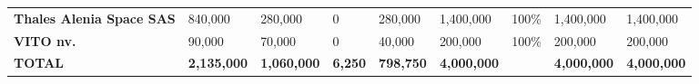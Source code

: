 \begin{landscape}
\begin{table}[H]
{\begin{tabular}{p{5cm}p{5cm}p{5cm}p{5cm}p{5cm}p{5cm}p{5cm}p{5cm}p{5cm}}
    \textbf{Thales Alenia Space SAS}             & 840,000                                                                                               & 280,000                                                                                         &0                                                                                                                & 280,000                                                                                    & 1,400,000                                                                                                  & 100\%                                                                                                & 1,400,000                                                                                           & 1,400,000                                                                                             \\
    \textbf{VITO nv.}                                                                        & 90,000                                                                                                & 70,000                                                                                          &0                                                                                                                & 40,000                                                                                     & 200,000                                                                                                    & 100\%                                                                                                & 200,000                                                                                             & 200,000                                                                                               \\\hline
    \textbf{TOTAL}                                                                           & \textbf{2,135,000}                                                                                    & \textbf{1,060,000}                                                                              & \textbf{6,250}                                                                                                 & \textbf{798,750}                                                                           & \textbf{4,000,000}                                                                                         & \textbf{}                                                                                            & \textbf{4,000,000}                                                                                  & \textbf{4,000,000}                                                                                   
    \\ \bottomrule[2pt]
    \end{tabular}}
    \end{table}


\end{landscape}
